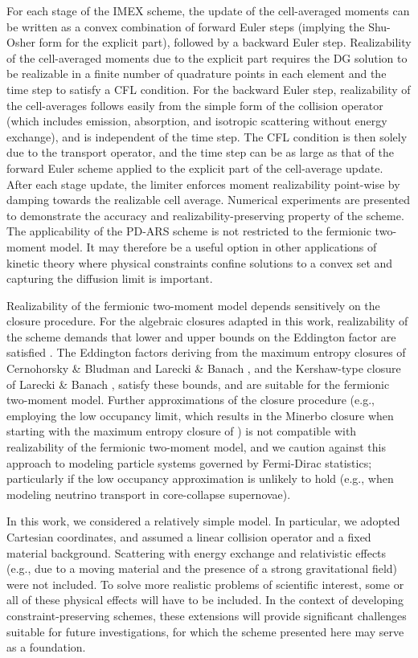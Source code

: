 For each stage of the IMEX scheme, the update of the cell-averaged moments can be written as a convex combination of forward Euler steps (implying the Shu-Osher form for the explicit part), followed by a backward Euler step.  
Realizability of the cell-averaged moments due to the explicit part requires the DG solution to be realizable in a finite number of quadrature points in each element and the time step to satisfy a CFL condition.  
For the backward Euler step, realizability of the cell-averages follows easily from the simple form of the collision operator (which includes emission, absorption, and isotropic scattering without energy exchange), and is independent of the time step.  
The CFL condition is then solely due to the transport operator, and the time step can be as large as that of the forward Euler scheme applied to the explicit part of the cell-average update.  
After each stage update, the limiter enforces moment realizability point-wise by damping towards the realizable cell average.  
Numerical experiments are presented to demonstrate the accuracy and realizability-preserving property of the scheme.  
The applicability of the PD-ARS scheme is not restricted to the fermionic two-moment model.  
It may therefore be a useful option in other applications of kinetic theory where physical constraints confine solutions to a convex set and capturing the diffusion limit is important.  

Realizability of the fermionic two-moment model depends sensitively on the closure procedure.  
For the algebraic closures adapted in this work, realizability of the scheme demands that lower and upper bounds on the Eddington factor are satisfied \cite{levermore_1984,lareckiBanach_2011}.  
The Eddington factors deriving from the maximum entropy closures of Cernohorsky \& Bludman \cite{cernohorskyBludman_1994} and Larecki \& Banach \cite{lareckiBanach_2011}, and the Kershaw-type closure of Larecki \& Banach \cite{banachLarecki_2017a}, satisfy these bounds, and are suitable for the fermionic two-moment model.  
Further approximations of the closure procedure (e.g., employing the low occupancy limit, which results in the Minerbo closure \cite{minerbo_1978} when starting with the maximum entropy closure of \cite{cernohorskyBludman_1994}) is not compatible with realizability of the fermionic two-moment model, and we caution against this approach to modeling particle systems governed by Fermi-Dirac statistics; particularly if the low occupancy approximation is unlikely to hold (e.g., when modeling neutrino transport in core-collapse supernovae).  

In this work, we considered a relatively simple model.  
In particular, we adopted Cartesian coordinates, and assumed a linear collision operator and a fixed material background.  
Scattering with energy exchange and relativistic effects (e.g., due to a moving material and the presence of a strong gravitational field) were not included.  
To solve more realistic problems of scientific interest, some or all of these physical effects will have to be included.  
In the context of developing constraint-preserving schemes, these extensions will provide significant challenges suitable for future investigations, for which the scheme presented here may serve as a foundation.  